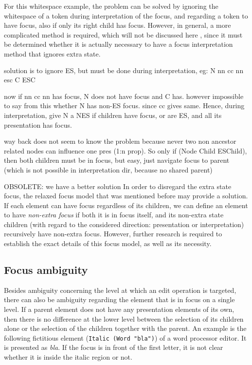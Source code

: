 For this whitespace example, the problem can be solved by ignoring the whitespace of a token during interpretation of the focus, and regarding a token to have focus, also if only its right child has focus. However, in general, a more complicated method is required, which will not be discussed here , since it must be determined whether it is actually necessary to have a focus interpretation method that ignores extra state. 

\bc
solution is to ignore ES, but must be done during interpretation, eg:
  N       nn cc nn esc
C ESC 

now if nn cc nn has focus, N does not have focus and C has. however impossible to say from this whether N has non-ES focus. since cc gives same. Hence, during interpretation, give N a NES if children have focus, or are ES, and all its presentation has focus.
\ec

\bc
way back does not seem to know the problem because never two non ancestor related nodes can influence one pres (1:n prop). So only if (Node Child ESChild), then both children must be in focus, but easy, just navigate focus to parent (which is not possible in interpretation dir, because no shared parent)
\ec

\bc OBSOLETE: we have a better solution
In order to disregard the extra state focus, the relaxed focus model that was mentioned before may provide a solution. If each element can have focus regardless of its children, we can define an element to have {\em non-extra focus} if both it is in focus itself, and its non-extra state children (with regard to the considered direction: presentation or interpretation) recursively have non-extra focus. However, further research is required to establish the exact details of this focus model, as well as its necessity.
\ec

%																
\subsection{Focus ambiguity}

Besides ambiguity concerning the level at which an edit operation is targeted, there can also be  ambiguity regarding the element that is in focus on a single level. If a parent element does not have any presentation elements of its own, then there is no difference at the lower level between the selection of its children alone or the selection of the children together with the parent. An example is the following fictitious element (\verb|Italic (Word "bla")|) of a word processor editor. It is presented as {\it bla}. If the focus is in front of the first letter, it is not clear whether it is inside the italic region or not. 


